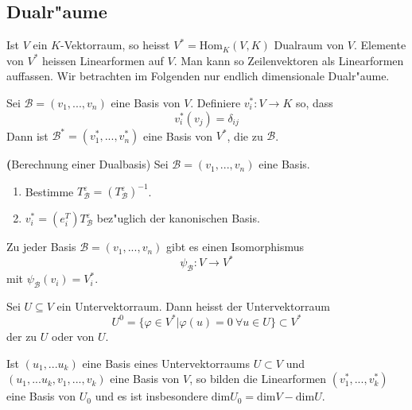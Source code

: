 \documentclass[8pt, a4paper, twocolumn, landscape]{article}
\newcommand{\comment}[1]{}
\begin{document}
\subsection{Dualr"aume}
\begin{definition}
Ist $V$ ein $K$-Vektorraum, so heisst $V^* = \mathrm{Hom}_K(V, K)$ Dualraum von $V$. Elemente von $V^*$ heissen Linearformen auf $V$. Man kann so Zeilenvektoren als Linearformen auffassen. Wir betrachten im Folgenden nur endlich dimensionale Dualr"aume.
\end{definition}


\begin{remark}
Sei $\mathcal{B} = (v_1, ..., v_n)$ eine Basis von $V$. Definiere $v_i^*: V \rightarrow K$ so, dass 
$$
v_i^*(v_j) = \delta_{ij}
$$
Dann ist $\mathcal{B}^* = (v^*_1, ..., v^*_n)$ eine Basis von $V^*$, die  zu $\mathcal{B}$.
\end{remark}


\begin{remark} \textbf({Berechnung einer Dualbasis)}
Sei $\mathcal{B} = (v_1, ..., v_n)$ eine Basis.
\begin{enumerate}
\item Bestimme $T^\varepsilon_\mathcal{B} = (T_\mathcal{B}^\varepsilon)^{-1}$. 
\item $v_i^* = \left(e_i^T \right) T^\varepsilon_\mathcal{B}$ bez"uglich der kanonischen Basis.
\end{enumerate}
\end{remark}


\comment{
\begin{corollary}
Sei $v \in V$ mit $v \neq 0$. Dann gibt es $\varphi \in V^*$, si dass $\varphi (v) \neq 0$.
\end{corollary}
}

\begin{corollary}
Zu jeder Basis $\mathcal{B} = (v_1, ..., v_n)$ gibt es einen Isomorphismus
$$
\psi_\mathcal{B} :V \rightarrow V^*
$$ 
mit $\psi_\mathcal{B}(v_i) = V^*_i$.
\end{corollary}
 
\begin{definition}
Sei $U \subseteq V$ ein Untervektorraum. Dann heisst der Untervektorraum
$$
U^0 = \{ \varphi \in V^* | \varphi(u) = 0 \ \forall u \in U \} \subset V^*
$$
der zu $U$  oder  von $U$.
\end{definition}

\begin{theorem}
Ist $(u_1, ... u_k)$ eine Basis eines Untervektorraums $U \subset V$ und $(u_1, ... u_k, v_1, ..., v_k)$ eine Basis von $V$, so bilden die Linearformen $(v_1^*, ..., v_k^*)$ eine Basis von $U_0$ und es ist insbesondere 
$
\mathrm{dim} U_0 = \mathrm{dim} V - \mathrm{dim} U.
$
\end{theorem}
 
\end{document}
